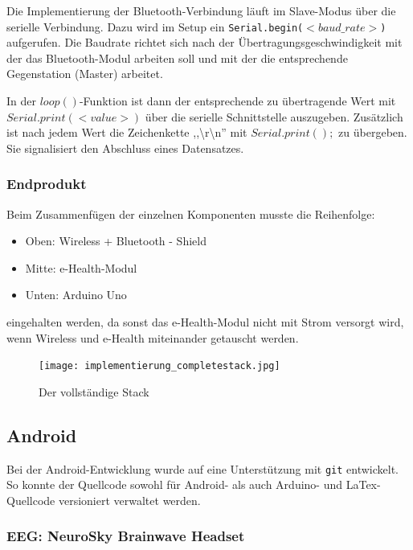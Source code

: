 	Die Implementierung der Bluetooth-Verbindung läuft im Slave-Modus über die serielle Verbindung. Dazu wird im Setup ein \texttt{Serial.begin($<baud\_rate>$)} aufgerufen. Die Baudrate richtet sich nach der Übertragungsgeschwindigkeit mit der das Bluetooth-Modul arbeiten soll und mit der die entsprechende Gegenstation (Master) arbeitet. 
	
	In der $loop()$-Funktion ist dann der entsprechende zu übertragende Wert mit \\$Serial.print(<value>)$ über die serielle Schnittstelle auszugeben. Zusätzlich ist nach jedem Wert die Zeichenkette ,,\textbackslash r\textbackslash n'' mit $Serial.print();$ zu übergeben. Sie signalisiert den Abschluss eines Datensatzes.
	
	
	\subsubsection{Endprodukt}

	Beim Zusammenfügen der einzelnen Komponenten musste die Reihenfolge:
	\begin{itemize}
	\item Oben: Wireless + Bluetooth - Shield
	\item Mitte: e-Health-Modul
	\item Unten: Arduino Uno
	\end{itemize}
	
	eingehalten werden, da sonst das e-Health-Modul nicht mit Strom versorgt wird, wenn Wireless und e-Health miteinander getauscht werden. 
	
	\begin{figure}[hbtp]
	\centering
	\texttt{[image: implementierung\_completestack.jpg]}
	\caption{Der vollständige Stack}
	\label{fig:completeStack}
	\end{figure}
	
	
	\newpage
	\subsection{Android}
	
	Bei der Android-Entwicklung wurde auf eine Unterstützung mit \texttt{git} entwickelt. So konnte der Quellcode sowohl für Android- als auch Arduino- und LaTex-Quellcode versioniert verwaltet werden.
	
	\subsubsection{EEG: NeuroSky Brainwave Headset}
	
